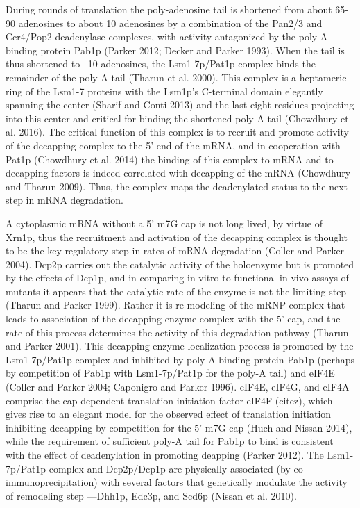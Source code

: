 During rounds of
translation the poly-adenosine tail is shortened from about 65-90
adenosines to about 10 adenosines by a combination of the Pan2/3 and
Ccr4/Pop2 deadenylase complexes, with activity antagonized by the
poly-A binding protein Pab1p (Parker 2012; Decker and Parker 1993).
When the tail is thus shortened to ~10 adenosines, the Lsm1-7p/Pat1p
complex binds the remainder of the poly-A tail (Tharun et al. 2000).
This complex is a heptameric ring of the Lsm1-7 proteins with the
Lsm1p’s C-terminal domain elegantly spanning the center (Sharif and
Conti 2013) and the last eight residues projecting into this center
and critical for binding the shortened poly-A tail (Chowdhury et al.
2016). The critical function of this complex is to recruit and promote
activity of the decapping complex to the 5’ end of the mRNA, and in
cooperation with Pat1p (Chowdhury et al. 2014) the binding of this
complex to mRNA and to decapping factors is indeed correlated with
decapping of the mRNA (Chowdhury and Tharun 2009). Thus, the complex
maps the deadenylated status to the next step in mRNA degradation.  

A
cytoplasmic mRNA without a 5’ m7G cap is not long lived, by virtue of
Xrn1p, thus the recruitment and activation of the decapping complex is
thought to be the key regulatory step in rates of mRNA degradation
(Coller and Parker 2004). Dcp2p carries out the catalytic activity of
the holoenzyme but is promoted by the effects of Dcp1p, and in
comparing in vitro to functional in vivo assays of mutants it appears
that the catalytic rate of the enzyme is not the limiting step (Tharun
and Parker 1999). Rather it is re-modeling of the mRNP complex that
leads to association of the decapping enzyme complex with the 5’ cap,
and the rate of this process determines the activity of this
degradation pathway (Tharun and Parker 2001). This
decapping-enzyme-localization process is promoted by the Lsm1-7p/Pat1p
complex and inhibited by poly-A binding protein Pab1p (perhaps by
competition of Pab1p with Lsm1-7p/Pat1p for the poly-A tail) and eIF4E
(Coller and Parker 2004; Caponigro and Parker 1996). eIF4E, eIF4G, and
eIF4A comprise the cap-dependent translation-initiation factor eIF4F
(citez), which gives rise to an elegant model for the observed effect
of translation initiation inhibiting decapping by competition for the
5’ m7G cap (Huch and Nissan 2014), while the requirement of sufficient
poly-A tail for Pab1p to bind is consistent with the effect of
deadenylation in promoting deapping (Parker 2012). The Lsm1-7p/Pat1p
complex and Dcp2p/Dcp1p are physically associated (by
co-immunoprecipitation) with several factors that genetically modulate
the activity of remodeling step ---Dhh1p, Edc3p, and Scd6p (Nissan et
al. 2010).  

